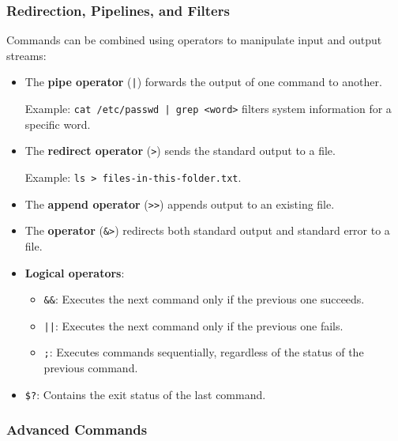 \subsubsection{Redirection, Pipelines, and Filters}
\vspace{-0.3em}

Commands can be combined using operators to manipulate input and output streams:
\begin{itemize}
    \item The \textbf{pipe operator} (\texttt{|}) forwards the output of one command to another.
    
    Example: \texttt{cat /etc/passwd | grep <word>} filters system information for a specific word.
    
    \item The \textbf{redirect operator} (\texttt{>}) sends the standard output to a file.
    
    Example: \texttt{ls > files-in-this-folder.txt}.
    
    \item The \textbf{append operator} (\texttt{>>}) appends output to an existing file.
    \item The \textbf{operator} (\texttt{\&>}) redirects both standard output and standard error to a file.
    \item \textbf{Logical operators}:
    \begin{itemize}
        \item \texttt{\&\&}: Executes the next command only if the previous one succeeds.
        \item \texttt{||}: Executes the next command only if the previous one fails.
        \item \texttt{;}: Executes commands sequentially, regardless of the status of the previous command.
    \end{itemize}
    \item \texttt{\$?}: Contains the exit status of the last command.
\end{itemize}

\subsubsection{Advanced Commands}

\vspace{-1em}



